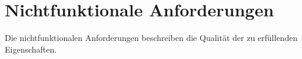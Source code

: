 \section{Nichtfunktionale Anforderungen}

Die nichtfunktionalen Anforderungen beschreiben die Qualität der zu erfüllenden Eigenschaften.